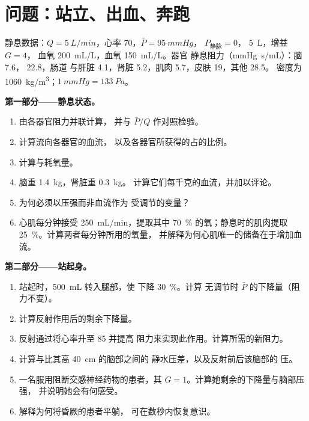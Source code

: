 \section{问题：站立、出血、奔跑}

\begin{problem}
\label{pb:b2:blood-pressure:1}
静息数据：$Q = \qty{5}{L/min}$，心率 70，$\bar P = \qty{95}{mmHg}$，
$P_{\text{静脉}} = 0$， \qty{5}{L}，增益 $G = 4$，
血氧 \qty{200}{mL/L}，血氧 \qty{150}{mL/L}。器官
静息阻力（\unit{mmHg.s/mL}）：脑 7.6， 22.8，肠道
与肝脏 4.1，肾脏 5.2，肌肉 5.7，皮肤 19，其他 28.5。
密度为 \qty{1060}{kg/m^3}；$\qty{1}{mmHg} = \qty{133}{Pa}$。

\medskip
\noindent\textbf{第一部分——静息状态。}
\begin{enumerate}
  \item 由各器官阻力并联计算，
        并与 $\bar P/Q$ 作对照检验。
  \item 计算流向各器官的血流，
        以及各器官所获得的占的比例。
  \item 计算与耗氧量。
  \item 脑重 \qty{1.4}{kg}，肾脏重 \qty{0.3}{kg}。
        计算它们每千克的血流，并加以评论。
  \item 为何必须以压强而非血流作为
        受调节的变量？
  \item 心肌每分钟接受 \qty{250}{mL/min}，提取其中
        \qty{70}{\%} 的氧；静息时的肌肉提取
        \qty{25}{\%}。计算两者每分钟所用的氧量，
        并解释为何心肌唯一的储备在于增加血流。
\end{enumerate}

\medskip
\noindent\textbf{第二部分——站起身。}
\begin{enumerate}[resume]
  \item 站起时，\qty{500}{mL} 转入腿部，使
        下降 \qty{30}{\%}。计算
        无调节时 $\bar P$ 的下降量（阻力不变）。
  \item 计算反射作用后的剩余下降量。
  \item 反射通过将心率升至 85 并提高
        阻力来实现此作用。计算所需的新阻力。
  \item 计算与比其高 \qty{40}{cm} 的脑部之间的
        静水压差，以及反射前后该脑部的
        压。
  \item 一名服用阻断交感神经药物的患者，其
        $G = 1$。计算她剩余的下降量与脑部压强，
        并说明她会有何感受。
  \item 解释为何将昏厥的患者平躺，
        可在数秒内恢复意识。
\end{enumerate}


\end{problem}
